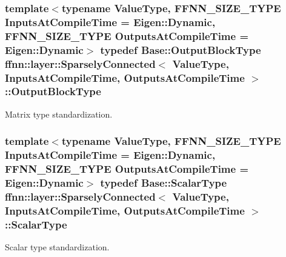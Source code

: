 \hypertarget{classffnn_1_1layer_1_1_sparsely_connected_aacf4fb49a3f57aba90e55d8d3c63cf45}{
\subsubsection[{Output\-Block\-Type}]{\setlength{\rightskip}{0pt plus 5cm}template$<$typename Value\-Type, F\-F\-N\-N\-\_\-\-S\-I\-Z\-E\-\_\-\-T\-Y\-P\-E Inputs\-At\-Compile\-Time = Eigen\-::\-Dynamic, F\-F\-N\-N\-\_\-\-S\-I\-Z\-E\-\_\-\-T\-Y\-P\-E Outputs\-At\-Compile\-Time = Eigen\-::\-Dynamic$>$ typedef {\bf Base\-::\-Output\-Block\-Type} {\bf ffnn\-::layer\-::\-Sparsely\-Connected}$<$ Value\-Type, Inputs\-At\-Compile\-Time, Outputs\-At\-Compile\-Time $>$\-::{\bf Output\-Block\-Type}}}\label{classffnn_1_1layer_1_1_sparsely_connected_aacf4fb49a3f57aba90e55d8d3c63cf45}


Matrix type standardization. 

\hypertarget{classffnn_1_1layer_1_1_sparsely_connected_abe2b75254f39c0bec9f02b2e906e7919}{
\subsubsection[{Scalar\-Type}]{\setlength{\rightskip}{0pt plus 5cm}template$<$typename Value\-Type, F\-F\-N\-N\-\_\-\-S\-I\-Z\-E\-\_\-\-T\-Y\-P\-E Inputs\-At\-Compile\-Time = Eigen\-::\-Dynamic, F\-F\-N\-N\-\_\-\-S\-I\-Z\-E\-\_\-\-T\-Y\-P\-E Outputs\-At\-Compile\-Time = Eigen\-::\-Dynamic$>$ typedef {\bf Base\-::\-Scalar\-Type} {\bf ffnn\-::layer\-::\-Sparsely\-Connected}$<$ Value\-Type, Inputs\-At\-Compile\-Time, Outputs\-At\-Compile\-Time $>$\-::{\bf Scalar\-Type}}}\label{classffnn_1_1layer_1_1_sparsely_connected_abe2b75254f39c0bec9f02b2e906e7919}


Scalar type standardization. 

